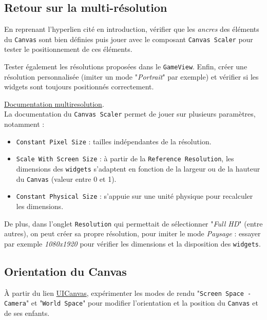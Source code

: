 \documentclass[a4paper,10pt]{article}
\newenvironment{solution}%
{\begin{tcolorbox}[breakable,colback=red!5!white,colframe=red!75!black,title=Solution]}%
{\end{tcolorbox}}
\begin{document}
\subsection{Retour sur la multi-résolution}
En reprenant l'hyperlien cité en introduction, vérifier que les \textit{ancres} des éléments du \texttt{Canvas} sont bien définies puis jouer avec le composant \texttt{Canvas Scaler} pour tester le positionnement de ces éléments. 

Tester également les résolutions proposées dans le \texttt{GameView}. Enfin, créer une résolution personnalisée (imiter un mode "\textit{Portrait}" par exemple) et vérifier si les widgets sont toujours positionnés correctement.

\ifversionenseignant
\begin{solution}
	\href{ https://docs.unity3d.com/2020.1/Documentation/Manual/HOWTO-UIMultiResolution.html}{Documentation multiresolution}. \\
	
La documentation du \texttt{Canvas Scaler} permet de jouer sur plusieurs paramètres, notamment :
\begin{itemize}
	\item \texttt{Constant Pixel Size} : tailles indépendantes de la résolution.
	\item \texttt{Scale With Screen Size} : à partir de la \texttt{Reference Resolution}, les dimensions des \texttt{widgets} s'adaptent en fonction de la largeur ou de la hauteur du \texttt{Canvas} (valeur entre 0 et 1).
	\item \texttt{Constant Physical Size} : s'appuie sur une unité physique pour recalculer les dimensions.
\end{itemize}

De plus, dans l'onglet \texttt{Resolution} qui permettait de sélectionner "\textit{Full HD}" (entre autres), on peut créer sa propre résolution, pour imiter le mode \textit{Paysage} : essayer par exemple \textit{1080x1920} pour vérifier les dimensions et la disposition des \texttt{widgets}.

\end{solution}
\fi 


\subsection{Orientation du Canvas}
À partir du lien \href{https://docs.unity3d.com/2022.3/Documentation/Manual/UICanvas.html}{UICanvas}, expérimenter les modes de rendu "\texttt{Screen Space - Camera}" et "\texttt{World Space}" pour modifier l'orientation et la position du \texttt{Canvas} et de ses enfants.
\end{document}
